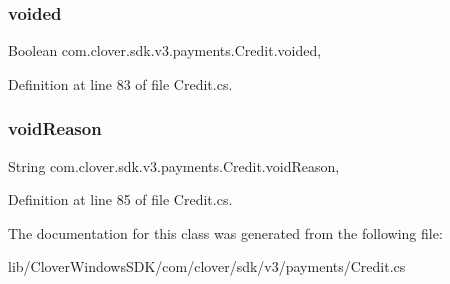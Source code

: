 \subsubsection{\texorpdfstring{voided}{voided}}
{\footnotesize\ttfamily Boolean com.\+clover.\+sdk.\+v3.\+payments.\+Credit.\+voided\hspace{0.3cm}{\ttfamily [get]}, {\ttfamily [set]}}



Definition at line 83 of file Credit.\+cs.

\mbox{\label{classcom_1_1clover_1_1sdk_1_1v3_1_1payments_1_1_credit_a15f2c21b091cb72c279bccd926eaf913}} 
\subsubsection{\texorpdfstring{void\+Reason}{voidReason}}
{\footnotesize\ttfamily String com.\+clover.\+sdk.\+v3.\+payments.\+Credit.\+void\+Reason\hspace{0.3cm}{\ttfamily [get]}, {\ttfamily [set]}}



Definition at line 85 of file Credit.\+cs.



The documentation for this class was generated from the following file\+:\begin{DoxyCompactItemize}
\item 
lib/\+Clover\+Windows\+S\+D\+K/com/clover/sdk/v3/payments/Credit.\+cs\end{DoxyCompactItemize}
